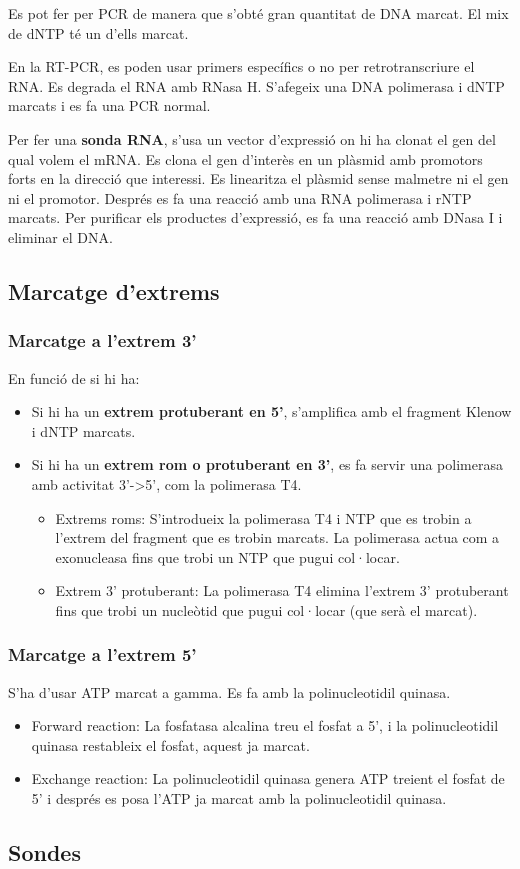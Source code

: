 Es pot fer per PCR de manera que s'obté gran quantitat de DNA marcat. El mix de dNTP té un d'ells marcat.

En la RT-PCR, es poden usar primers específics o no per retrotranscriure el RNA. Es degrada el RNA amb RNasa H. S'afegeix una DNA polimerasa i dNTP marcats i es fa una PCR normal.

Per fer una \textbf{sonda RNA}, s'usa un vector d'expressió on hi ha clonat el gen del qual volem el mRNA. Es clona el gen d'interès en un plàsmid amb promotors forts en la direcció que interessi. Es linearitza el plàsmid sense malmetre ni el gen ni el promotor. Després es fa una reacció amb una RNA polimerasa i rNTP marcats. Per purificar els productes d'expressió, es fa una reacció amb DNasa I i eliminar el DNA.

\subsection{Marcatge d'extrems}
\subsubsection{Marcatge a l'extrem 3'}
En funció de si hi ha:
\begin{itemize}
\item Si hi ha un \textbf{extrem protuberant en 5'}, s'amplifica amb el fragment Klenow i dNTP marcats.
\item Si hi ha un \textbf{extrem rom o protuberant en 3'}, es fa servir una polimerasa amb activitat 3'->5', com la polimerasa T4.
  \begin{itemize}
  \item Extrems roms: S'introdueix la polimerasa T4 i NTP que es trobin a l'extrem del fragment que es trobin marcats. La polimerasa actua com a exonucleasa fins que trobi un NTP que pugui col·locar.
  \item Extrem 3' protuberant: La polimerasa T4 elimina l'extrem 3' protuberant fins que trobi un nucleòtid que pugui col·locar (que serà el marcat).
  \end{itemize}
\end{itemize}

\subsubsection{Marcatge a l'extrem 5'}
S'ha d'usar ATP marcat a gamma. Es fa amb la polinucleotidil quinasa.

\begin{itemize}
\item Forward reaction: La fosfatasa alcalina treu el fosfat a 5', i la polinucleotidil quinasa restableix el fosfat, aquest ja marcat.

\item Exchange reaction: La polinucleotidil quinasa genera ATP treient el fosfat de 5' i després es posa l'ATP ja marcat amb la polinucleotidil quinasa.
\end{itemize}

\subsection{Sondes}